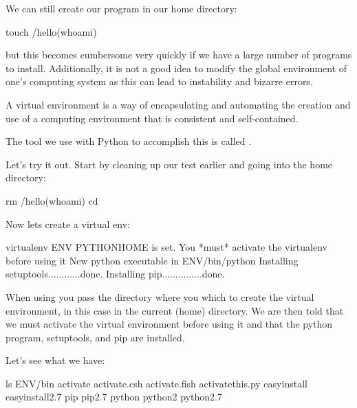 We can still create our program in our home directory:

\begin{sphinxVerbatim}[commandchars=\\\{\}]
\PYGZdl{} touch \PYGZti{}/hello\PYGZhy{}\PYGZdl{}(whoami)
\end{sphinxVerbatim}

but this becomes cumbersome very quickly if we have a large number of
programs to install.  Additionally, it is not a good idea to modify
the global environment of one's computing system as this can lead to
instability and bizarre errors.

A virtual environment is a way of encapsulating and automating the
creation and use of a computing environment that is consistent and
self-contained.

The tool we use with Python to accomplish this is called .

Let's try it out. Start by cleaning up our test earlier and going
into the home directory:

\begin{sphinxVerbatim}[commandchars=\\\{\}]
\PYGZdl{} rm \PYGZti{}/hello\PYGZhy{}\PYGZdl{}(whoami)
\PYGZdl{} cd \PYGZti{}
\end{sphinxVerbatim}

Now lets create a virtual env:

\begin{sphinxVerbatim}[commandchars=\\\{\}]
\PYGZdl{} virtualenv ENV
PYTHONHOME is set.  You *must* activate the virtualenv before using it
New python executable in ENV/bin/python
Installing setuptools............done.
Installing pip...............done.
\end{sphinxVerbatim}

When using  you pass the directory where you which to
create the virtual environment, in this case  in the current
(home) directory.  We are then told that we must activate the virtual
environment before using it and that the python program, setuptools,
and pip are installed.

Let's see what we have:

\begin{sphinxVerbatim}[commandchars=\\\{\}]
\PYGZdl{} ls ENV/bin
activate  activate.csh  activate.fish  activate\PYGZus{}this.py  easy\PYGZus{}install
easy\PYGZus{}install\PYGZhy{}2.7  pip  pip\PYGZhy{}2.7  python  python2  python2.7
\end{sphinxVerbatim}

